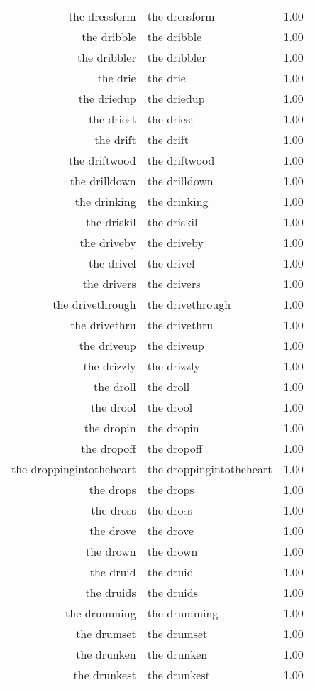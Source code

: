 \begin{table}[ht]
\begin{tabular}{rlr}
  the dressform & the dressform & 1.00 \\ 
  the dribble & the dribble & 1.00 \\ 
  the dribbler & the dribbler & 1.00 \\ 
  the drie & the drie & 1.00 \\ 
  the driedup & the driedup & 1.00 \\ 
  the driest & the driest & 1.00 \\ 
  the drift & the drift & 1.00 \\ 
  the driftwood & the driftwood & 1.00 \\ 
  the drilldown & the drilldown & 1.00 \\ 
  the drinking & the drinking & 1.00 \\ 
  the driskil & the driskil & 1.00 \\ 
  the driveby & the driveby & 1.00 \\ 
  the drivel & the drivel & 1.00 \\ 
  the drivers & the drivers & 1.00 \\ 
  the drivethrough & the drivethrough & 1.00 \\ 
  the drivethru & the drivethru & 1.00 \\ 
  the driveup & the driveup & 1.00 \\ 
  the drizzly & the drizzly & 1.00 \\ 
  the droll & the droll & 1.00 \\ 
  the drool & the drool & 1.00 \\ 
  the dropin & the dropin & 1.00 \\ 
  the dropoff & the dropoff & 1.00 \\ 
  the droppingintotheheart & the droppingintotheheart & 1.00 \\ 
  the drops & the drops & 1.00 \\ 
  the dross & the dross & 1.00 \\ 
  the drove & the drove & 1.00 \\ 
  the drown & the drown & 1.00 \\ 
  the druid & the druid & 1.00 \\ 
  the druids & the druids & 1.00 \\ 
  the drumming & the drumming & 1.00 \\ 
  the drumset & the drumset & 1.00 \\ 
  the drunken & the drunken & 1.00 \\ 
  the drunkest & the drunkest & 1.00 \\ 

\end{tabular}
\end{table}
